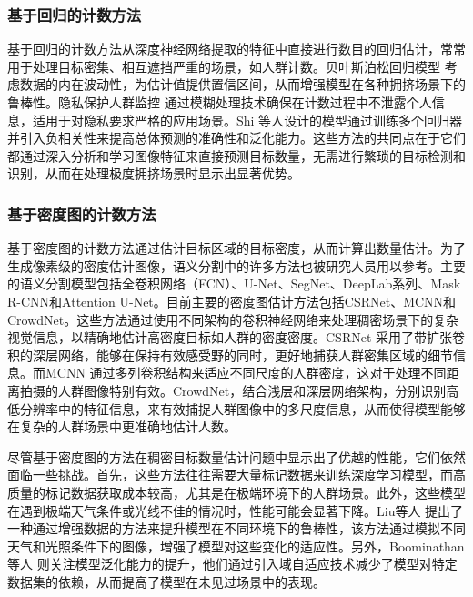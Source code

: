 \subsubsection{基于回归的计数方法}
基于回归的计数方法\cite{2022Crowddetectionanalysissurveillancevideosusingdeeplearning,2008PrivacypreservingcrowdmonitoringCountingpeoplepeoplemodelstracking,2009BayesianPoissonRegressionCrowdCounting}从深度神经网络提取的特征中直接进行数目的回归估计，常常用于处理目标密集、相互遮挡严重的场景，如人群计数。贝叶斯泊松回归模型\cite{2009BayesianPoissonRegressionCrowdCounting} 考虑数据的内在波动性，为估计值提供置信区间，从而增强模型在各种拥挤场景下的鲁棒性。隐私保护人群监控\cite{2008PrivacypreservingcrowdmonitoringCountingpeoplepeoplemodelstracking} 通过模糊处理技术确保在计数过程中不泄露个人信息，适用于对隐私要求严格的应用场景。Shi 等人\cite{2018CrowdCountingDeepNegativeCorrelationLearning}设计的模型通过训练多个回归器并引入负相关性来提高总体预测的准确性和泛化能力。这些方法的共同点在于它们都通过深入分析和学习图像特征来直接预测目标数量，无需进行繁琐的目标检测和识别，从而在处理极度拥挤场景时显示出显著优势。
\subsubsection{基于密度图的计数方法}
基于密度图的计数方法通过估计目标区域的目标密度，从而计算出数量估计。为了生成像素级的密度估计图像，语义分割中的许多方法也被研究人员用以参考。主要的语义分割模型包括全卷积网络（FCN）\cite{long2015fully}、U-Net\cite{ronneberger2015u}、SegNet\cite{badrinarayanan2017segnet}、DeepLab\cite{chen2014semantic,chen2017deeplab,2017RethinkingAtrousConvolutionSemanticImageSegmentation}系列、Mask R-CNN\cite{he2017mask}和Attention U-Net\cite{oktay2018attention}。目前主要的密度图估计方法包括CSRNet\cite{li2018csrnet}、MCNN\cite{2016SingleImageCrowdCountingMultiColumnConvolutionalNeuralNetwork}和CrowdNet\cite{boominathan2016crowdnet}。这些方法通过使用不同架构的卷积神经网络来处理稠密场景下的复杂视觉信息，以精确地估计高密度目标如人群的密度密度。CSRNet 采用了带扩张卷积的深层网络，能够在保持有效感受野的同时，更好地捕获人群密集区域的细节信息。而MCNN 通过多列卷积结构来适应不同尺度的人群密度，这对于处理不同距离拍摄的人群图像特别有效。CrowdNet，结合浅层和深层网络架构，分别识别高低分辨率中的特征信息，来有效捕捉人群图像中的多尺度信息，从而使得模型能够在复杂的人群场景中更准确地估计人数。

尽管基于密度图的方法在稠密目标数量估计问题中显示出了优越的性能，它们依然面临一些挑战。首先，这些方法往往需要大量标记数据来训练深度学习模型，而高质量的标记数据获取成本较高，尤其是在极端环境下的人群场景。此外，这些模型在遇到极端天气条件或光线不佳的情况时，性能可能会显著下降。Liu等人\cite{2018CrowdCountingusingDeepRecurrentSpatialAwareNetwork} 提出了一种通过增强数据的方法来提升模型在不同环境下的鲁棒性，该方法通过模拟不同天气和光照条件下的图像，增强了模型对这些变化的适应性。另外，Boominathan 等人\cite{boominathan2016crowdnet} 则关注模型泛化能力的提升，他们通过引入域自适应技术减少了模型对特定数据集的依赖，从而提高了模型在未见过场景中的表现。

